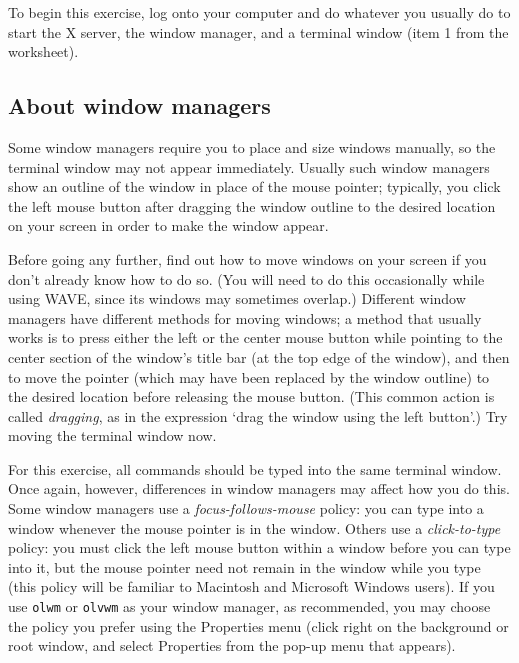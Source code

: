 \documentclass[twoside]{book}
\newcommand{\WAVE}{{\sf WAVE}\xspace}
\begin{document}
To begin this exercise, log onto your computer and do whatever you
usually do to start the X server, the window manager, and a terminal
window (item 1 from the worksheet).

\subsection*{About window managers}

{\small
Some window managers require you to place and size windows manually,
so the terminal window may not appear immediately.  Usually such
window managers show an outline of the window in place of the mouse
pointer; typically, you click the left mouse button after dragging the
window outline to the desired location on your screen in order to make
the window appear.

Before going any further, find out how to move windows on your screen
if you don't already know how to do so.  (You will need to do this
occasionally while using \WAVE{}, since its windows may sometimes
overlap.)  Different window managers have different methods for moving
windows; a method that usually works is to press either the left or
the center mouse button while pointing to the center section of the
window's title bar (at the top edge of the window), and then to move
the pointer (which may have been replaced by the window outline) to
the desired location before releasing the mouse button.  (This common
action is called \emph{dragging}, as in the expression `drag the window
using the left button'.)  Try moving the terminal window now.

For this exercise, all commands should be typed into the same terminal
window.  Once again, however, differences in window managers may
affect how you do this.  Some window managers use a
\emph{focus-follows-mouse} policy: you can type into a window whenever
the mouse pointer is in the window.  Others use a \emph{click-to-type}
policy: you must click the left mouse button within a window before
you can type into it, but the mouse pointer need not remain in the
window while you type (this policy will be familiar to Macintosh and
Microsoft Windows users).  If you use {\tt olwm} or {\tt olvwm} as
your window manager, as recommended, you may choose the policy you
prefer using the {\sf Properties} menu (click right on the background
or root window, and select {\sf Properties} from the pop-up menu that
appears).

}
\end{document}
